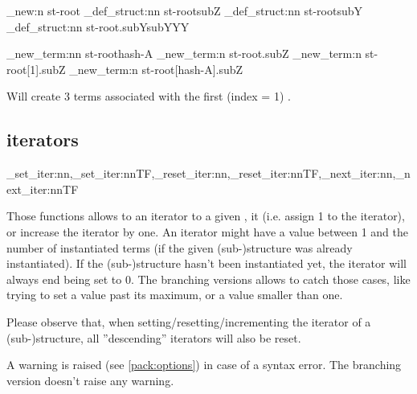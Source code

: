 \documentclass[10pt]{article}
\begin{document}
\begin{codestore}[store-env=demo6]
\starray_new:n {st-root}
\starray_def_struct:nn {st-root}{subZ}
\starray_def_struct:nn {st-root}{subY}
\starray_def_struct:nn {st-root.subY}{subYYY}

\starray_new_term:nn {st-root}{hash-A}
\starray_new_term:n {st-root.subZ}
\starray_new_term:n {st-root[1].subZ}
\starray_new_term:n {st-root[hash-A].subZ}
\end{codestore}
 
Will create 3  terms associated with the first (index = 1) .


\subsection{iterators}\label{pack:iter}

\begin{codedescribe}{\starray_set_iter:nn,\starray_set_iter:nnTF,\starray_reset_iter:nn,\starray_reset_iter:nnTF,\starray_next_iter:nn,\starray_next_iter:nnTF}
\begin{codesyntax}%
\end{codesyntax}
Those functions allows to  an iterator to a given ,  it (i.e. assign 1 to the iterator), or increase the iterator by one. An iterator might have a value between 1 and the number of instantiated terms (if the given (sub-)structure was already instantiated). If the (sub-)structure hasn't been instantiated yet, the iterator will always end being set to 0. The branching versions allows to catch those cases, like trying to set a value past its maximum, or a value smaller than one.
\end{codedescribe}

\begin{tsremark}[Important:]
Please observe that, when setting/resetting/incrementing the  iterator of a (sub-)structure, all ''descending'' iterators will also be reset.
\end{tsremark}
\begin{tsremark}
A warning is raised (see \ref{pack:options}) in case of a  syntax error. The branching version doesn't raise any warning.
\end{tsremark}
\end{document}
